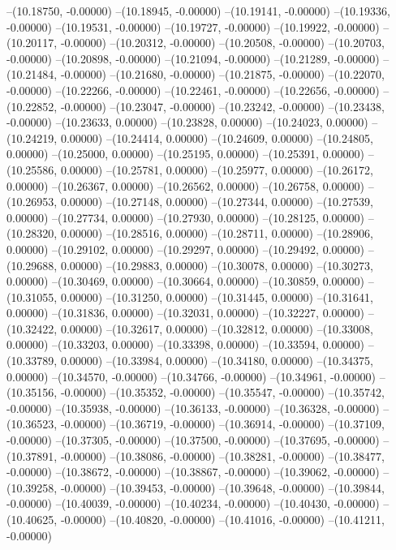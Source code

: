 --(10.18750, -0.00000)
--(10.18945, -0.00000)
--(10.19141, -0.00000)
--(10.19336, -0.00000)
--(10.19531, -0.00000)
--(10.19727, -0.00000)
--(10.19922, -0.00000)
--(10.20117, -0.00000)
--(10.20312, -0.00000)
--(10.20508, -0.00000)
--(10.20703, -0.00000)
--(10.20898, -0.00000)
--(10.21094, -0.00000)
--(10.21289, -0.00000)
--(10.21484, -0.00000)
--(10.21680, -0.00000)
--(10.21875, -0.00000)
--(10.22070, -0.00000)
--(10.22266, -0.00000)
--(10.22461, -0.00000)
--(10.22656, -0.00000)
--(10.22852, -0.00000)
--(10.23047, -0.00000)
--(10.23242, -0.00000)
--(10.23438, -0.00000)
--(10.23633, 0.00000)
--(10.23828, 0.00000)
--(10.24023, 0.00000)
--(10.24219, 0.00000)
--(10.24414, 0.00000)
--(10.24609, 0.00000)
--(10.24805, 0.00000)
--(10.25000, 0.00000)
--(10.25195, 0.00000)
--(10.25391, 0.00000)
--(10.25586, 0.00000)
--(10.25781, 0.00000)
--(10.25977, 0.00000)
--(10.26172, 0.00000)
--(10.26367, 0.00000)
--(10.26562, 0.00000)
--(10.26758, 0.00000)
--(10.26953, 0.00000)
--(10.27148, 0.00000)
--(10.27344, 0.00000)
--(10.27539, 0.00000)
--(10.27734, 0.00000)
--(10.27930, 0.00000)
--(10.28125, 0.00000)
--(10.28320, 0.00000)
--(10.28516, 0.00000)
--(10.28711, 0.00000)
--(10.28906, 0.00000)
--(10.29102, 0.00000)
--(10.29297, 0.00000)
--(10.29492, 0.00000)
--(10.29688, 0.00000)
--(10.29883, 0.00000)
--(10.30078, 0.00000)
--(10.30273, 0.00000)
--(10.30469, 0.00000)
--(10.30664, 0.00000)
--(10.30859, 0.00000)
--(10.31055, 0.00000)
--(10.31250, 0.00000)
--(10.31445, 0.00000)
--(10.31641, 0.00000)
--(10.31836, 0.00000)
--(10.32031, 0.00000)
--(10.32227, 0.00000)
--(10.32422, 0.00000)
--(10.32617, 0.00000)
--(10.32812, 0.00000)
--(10.33008, 0.00000)
--(10.33203, 0.00000)
--(10.33398, 0.00000)
--(10.33594, 0.00000)
--(10.33789, 0.00000)
--(10.33984, 0.00000)
--(10.34180, 0.00000)
--(10.34375, 0.00000)
--(10.34570, -0.00000)
--(10.34766, -0.00000)
--(10.34961, -0.00000)
--(10.35156, -0.00000)
--(10.35352, -0.00000)
--(10.35547, -0.00000)
--(10.35742, -0.00000)
--(10.35938, -0.00000)
--(10.36133, -0.00000)
--(10.36328, -0.00000)
--(10.36523, -0.00000)
--(10.36719, -0.00000)
--(10.36914, -0.00000)
--(10.37109, -0.00000)
--(10.37305, -0.00000)
--(10.37500, -0.00000)
--(10.37695, -0.00000)
--(10.37891, -0.00000)
--(10.38086, -0.00000)
--(10.38281, -0.00000)
--(10.38477, -0.00000)
--(10.38672, -0.00000)
--(10.38867, -0.00000)
--(10.39062, -0.00000)
--(10.39258, -0.00000)
--(10.39453, -0.00000)
--(10.39648, -0.00000)
--(10.39844, -0.00000)
--(10.40039, -0.00000)
--(10.40234, -0.00000)
--(10.40430, -0.00000)
--(10.40625, -0.00000)
--(10.40820, -0.00000)
--(10.41016, -0.00000)
--(10.41211, -0.00000)
